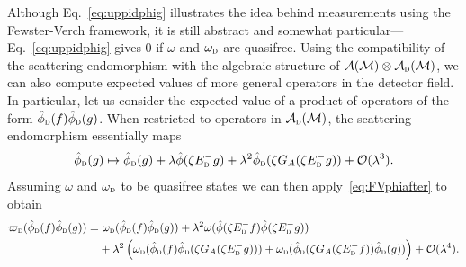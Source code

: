 \documentclass[letterpaper,12pt,titlepage,oneside,final]{book}
\newcommand{\M}{\mathcal{M}}
\newcommand{\tc}[1]{\textsc{#1}}
\newcommand{\trr}[1]{\textcolor{red}{#1}}
\begin{document}
Although Eq.~\eqref{eq:uppidphig} illustrates the idea behind measurements using the Fewster-Verch framework, it is still abstract and somewhat particular---Eq.~\eqref{eq:uppidphig} gives $0$ if $\omega$ and $\omega_\tc{d}$ are quasifree. Using the compatibility of the scattering endomorphism with the algebraic structure of $\mathcal{A}(\M)\otimes \mathcal{A}_\tc{d}(\M)$, we can also compute expected values of more general operators in the detector field. In particular, let us consider the expected value of a product of operators of the form $\hat{\phi}_\tc{d}(f)\hat{\phi}_\tc{d}(g)$. When restricted to operators in $\mathcal{A}_\tc{d}(\M)$, the scattering endomorphism essentially maps
\begin{equation}\label{eq:FVphiafter}
    \hat{\phi}_\tc{d}(g) \mapsto \hat{\phi}_\tc{d}(g) + \lambda \hat{\phi}(\zeta E_{\tc{d}}^- g) + \lambda^2 \hat{\phi}_\tc{d}(\zeta G_A(\zeta E_\tc{d}^-g)) + \mathcal{O}(\lambda^3).
\end{equation}
Assuming $\omega$ and $\omega_\tc{d}$ to be quasifree states we can then apply~\eqref{eq:FVphiafter} to obtain
\begin{align}\label{eq:FVWfg}
    \varpi_\tc{d}(\hat{\phi}_\tc{d}(f)\hat{\phi}_\tc{d}(g)) = &\,\, \omega_\tc{d}(\hat{\phi}_\tc{d}(f)\hat{\phi}_\tc{d}(g)) + \lambda^2 \omega(\hat{\phi}(\zeta E_\tc{d}^- f)\hat{\phi}(\zeta E_\tc{d}^- g)) \\&+ \lambda^2 \left(\omega_\tc{d}(\hat{\phi}_\tc{d}(f)\hat{\phi}_\tc{d}(\zeta G_A(\zeta E_\tc{d}^-g))) + \omega_\tc{d}(\hat{\phi}_\tc{d}(\zeta G_A(\zeta E_\tc{d}^- f))\hat{\phi}_\tc{d}(g))\right) + \mathcal{O}(\lambda^4)\nonumber.
\end{align}

\end{document}
